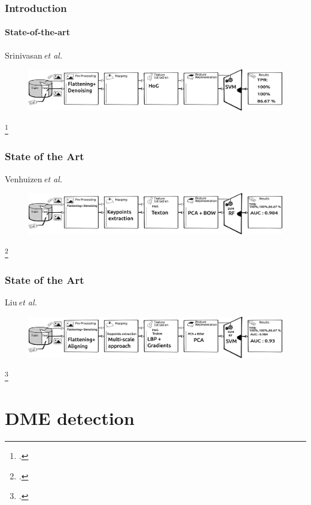 \documentclass{beamer}
\begin{document}
\begin{frame}
  \frametitle{Introduction}
  \framesubtitle{State-of-the-art}
  \begin{block}{Srinivasan\,\textit{et al.}~\footnotemark }
    \begin{figure}
      \centering
      \includegraphics[width=1.\textwidth]{./images/srini.png}
    \end{figure}
  \end{block}
  \footcitetext{Srinivasan2014}
\end{frame}
\begin{frame}
  \frametitle{State of the Art}
  \begin{block}{Venhuizen\,\textit{et al.}~\footnotemark}
    \begin{figure}
      \centering
      \includegraphics[width=1.\textwidth]{./images/ven.png}
    \end{figure}
  \end{block}
  \footcitetext{Venhuizen2015}
\end{frame}
\begin{frame}
  \frametitle{State of the Art}
  \begin{block}{Liu\,\textit{et al.}~\footnotemark}
    \begin{figure}
      \centering
      \includegraphics[width=1.\textwidth]{./images/liu.png}
    \end{figure}
  \end{block}
  \footcitetext{Liu2011}
\end{frame}

\section{DME detection}
\end{document}
